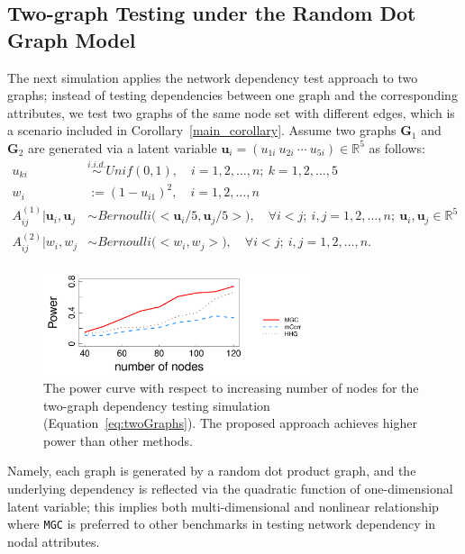 \documentclass[12pt]{article}
\theoremstyle{definition}
\begin{document}
	\subsection{Two-graph Testing under the Random Dot Graph Model}
	\label{ssec:twographs}
	
	The next simulation applies the network dependency test approach to two graphs; instead of testing dependencies between one graph and the corresponding attributes, we test two graphs of the same node set with different edges, which is a scenario included in Corollary~\ref{main_corollary}. 
	Assume two graphs $\mathbf{G}_{1}$ and $\mathbf{G}_{2}$ are generated via a latent variable $\mathbf{u}_{i} = ( u_{1i}~ u_{2i}~ \cdots ~u_{5i} ) \in \mathbb{R}^{5}$ as follows:
	\begin{equation}
	\begin{split}
	u_{ki} & \overset{i.i.d.}{\sim} Unif(0, 1), \quad i = 1,2, \ldots, n;~k = 1,2,\ldots, 5 \\
	w_{i} & := (1- u_{i1} )^{2}, \quad i = 1,2, \ldots, n \\
	A^{(1)}_{ij} \big| \mathbf{u}_{i}, \mathbf{u}_{j} & \sim Bernoulli \big( <\mathbf{u}_{i}/5, \mathbf{u}_{j}/5  > \big), \quad \forall i < j;~i,j=1,2,\ldots,n;~\mathbf{u}_{i}, \mathbf{u}_{j} \in \mathbb{R}^{5} \\
	A^{(2)}_{ij} \big| w_{i}, w_{j} & \sim Bernoulli \big( <w_{i}, w_{j}  > \big), \quad \forall i < j;~i,j=1,2,\ldots,n.
	\end{split}
	\label{eq:twoGraphs}
	\end{equation}
	
	\begin{figure}[ht]
		\centering
		\includegraphics[width=0.7\textwidth]{../Figure/Graphs.pdf}
		\caption{The power curve with respect to increasing number of nodes for the two-graph dependency testing simulation (Equation~\ref{eq:twoGraphs}). The proposed approach achieves higher power than other methods.}
		\label{fig:graphtest}
	\end{figure}
	
	Namely, each graph is generated by a random dot product graph, and the underlying dependency is reflected via the quadratic function of one-dimensional latent variable; this implies both multi-dimensional and nonlinear relationship where \texttt{MGC} is preferred to other benchmarks in testing network dependency in nodal attributes.  
	
\end{document}
